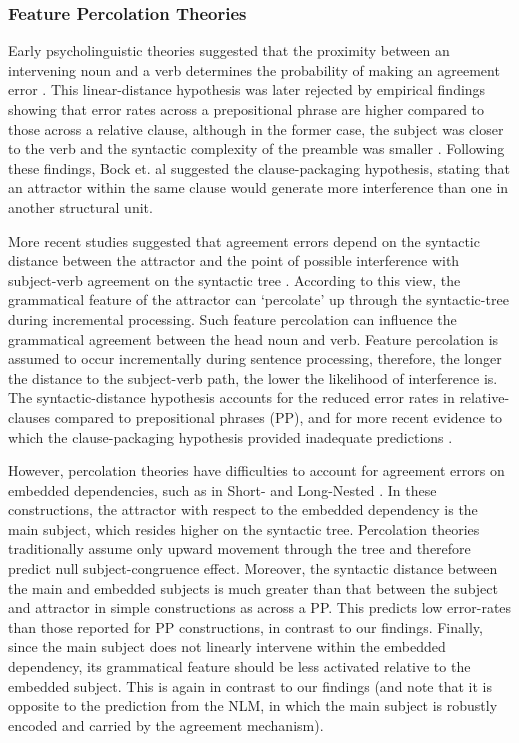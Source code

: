 \subsubsection{Feature Percolation Theories}
Early psycholinguistic theories suggested that the proximity between an intervening noun and a verb determines the probability of making an agreement error \citep{quirk1972grammar}. This linear-distance hypothesis was later rejected by empirical findings showing that error rates across a prepositional phrase are higher compared to those across a relative clause, although in the former case, the subject was closer to the verb and the syntactic complexity of the preamble was smaller \citep{bock1992regulating}. Following these findings, Bock et. al suggested the clause-packaging hypothesis, stating that an attractor within the same clause would generate more interference than one in another structural unit. 

More recent studies suggested that agreement errors depend on the syntactic distance between the attractor and the point of possible interference with subject-verb agreement on the syntactic tree  \citep{vigliocco1995constructing, vigliocco1999sex, franck2002subject}. According to this view, the grammatical feature of the attractor can `percolate’ up through the syntactic-tree during incremental processing. Such feature percolation can influence the grammatical agreement between the head noun and verb. Feature percolation is assumed to occur incrementally during sentence processing, therefore, the longer the distance to the subject-verb path, the lower the likelihood of interference is. The syntactic-distance hypothesis accounts for the reduced error rates in relative-clauses compared to prepositional phrases (PP), and for more recent evidence to which the clause-packaging hypothesis provided inadequate predictions \citep{franck2002subject}.

However, percolation theories have difficulties to account for agreement errors on embedded dependencies, such as in Short- and Long-Nested \citep{wagers2009agreement, lago2015agreement}. In these constructions, the attractor with respect to the embedded dependency is the main subject, which resides higher on the syntactic tree. Percolation theories traditionally assume only upward movement through the tree and therefore predict null subject-congruence effect. Moreover, the syntactic distance between the main and embedded subjects is much greater than that between the subject and attractor in simple constructions as across a PP. This predicts low error-rates than those reported for PP constructions, in contrast to our findings. Finally, since the main subject does not linearly intervene within the embedded dependency, its grammatical feature should be less activated relative to the embedded subject. This is again in contrast to our findings (and note that it is opposite to the prediction from the NLM, in which the main subject is robustly encoded and carried by the agreement mechanism).


